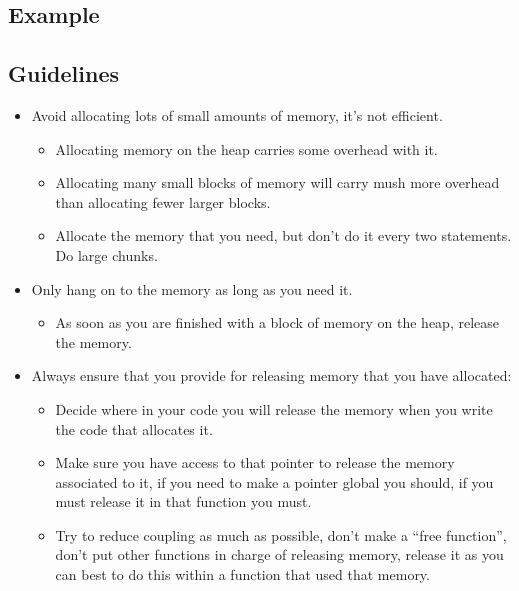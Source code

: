 \subsection{Example}

\subsection{Guidelines}
\begin{itemize}
    \item Avoid allocating lots of small amounts of memory, it's not efficient.
        \begin{itemize}
            \item Allocating memory on the heap carries some overhead with it.
            \item Allocating many small blocks of memory will carry mush more overhead than allocating fewer larger blocks. 
            \item Allocate the memory that you need, but don't do it every two statements. Do large chunks. 
        \end{itemize}
    
    \item Only hang on to the memory as long as you need it.
        \begin{itemize}
            \item As soon as you are finished with a block of memory on the heap, release the memory.
        \end{itemize}
    
    \item Always ensure that you provide for releasing memory that you have allocated:
        \begin{itemize}
            \item Decide where in your code you will release the memory when you write the code that allocates it. 
            \item Make sure you have access to that pointer to release the memory associated to it, if you need to make a pointer global you should, if you must release it in that function you must. 
            \item Try to reduce coupling as much as possible, don't make a ``free function'', don't put other functions in charge of releasing memory, release it as you can best to do this within a function that used that memory. 
        \end{itemize}
    

\end{itemize}
